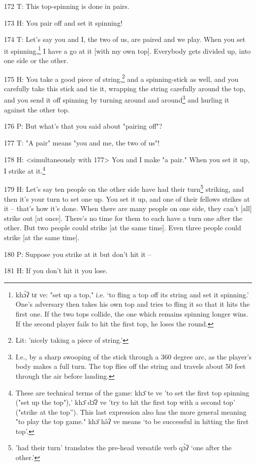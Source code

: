 172 T: This top-spinning is done in pairs.

173 H: You pair off and set it spinning!

174 T: Let's say you and I, the two of us, are paired and we play. When you set
it spinning,\footnote{khɔ̀ʔ tɛ ve: "set up a top," i.e. `to fling a top off its string and set it spinning.' One's adversary then takes his own top and tries to fling it so that it hits the first one. If the two tops collide, the one which remains spinning longer wins. If the second player fails to hit the first top, he loses the round.} I have a go at it [with my own top]. Everybody gets divided up,
into one side or the other.

175 H: You take a good piece of string,\footnote{Lit: 'nicely taking a piece of string.'} and a spinning-stick as well, and you
carefully take this stick and tie it, wrapping the string carefully around the
top, and you send it off spinning by turning around and around\footnote{I.e., by a sharp swooping of the stick through a 360 degree arc, as the player's body makes a full turn. The top flies off the string and travels about 50 feet through the air before landing.} and hurling
it against the other top.

176 P: But what's that you said about "pairing off"?

177 T: "A pair" means "you and me, the two of us"!

178 H: <simultaneously with 177> You and I make "a pair."
When you set it up, I strike at it.\footnote{These are technical terms of the game: khɔ̄ te ve 'to set the first top spinning ("set up the top"),' khɔ̄ dɔ̂ʔ ve 'try to hit the first top with a second top' ("strike at the top''). This last expression also has the more general meaning "to play the top game." khɔ̄ hə̂ʔ ve means `to be successful in hitting the first top'.}

179 H: Let's say ten people on the other side have had their turn\footnote{'had their turn' translates the pre-head versatile verb qɔ̀ʔ `one after the other.'} striking,
and then it's your turn to set one up. You set it up, and one of their fellows
strikes at it -- that's how it's done. When there are many people on one side,
they can't [all] strike out [at once]. There's no time for them to each have a
turn one after the other. But two people could strike [at the same time]. Even
three people could strike [at the same time].

180 P: Suppose you strike at it but don't hit it --

181 H: If you don't hit it you lose.

